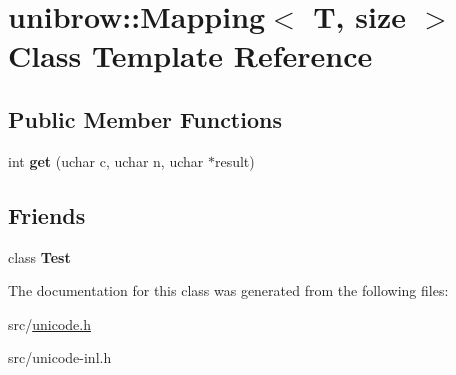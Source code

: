 \hypertarget{classunibrow_1_1_mapping}{}\section{unibrow\+:\+:Mapping$<$ T, size $>$ Class Template Reference}
\label{classunibrow_1_1_mapping}
\subsection*{Public Member Functions}
\begin{DoxyCompactItemize}
\item 
\hypertarget{classunibrow_1_1_mapping_af188d9e55a5717b581e026969b33cd38}{}int {\bfseries get} (uchar c, uchar n, uchar $\ast$result)\label{classunibrow_1_1_mapping_af188d9e55a5717b581e026969b33cd38}

\end{DoxyCompactItemize}
\subsection*{Friends}
\begin{DoxyCompactItemize}
\item 
\hypertarget{classunibrow_1_1_mapping_a5b78b1c2e1fa07ffed92da365593eaa4}{}class {\bfseries Test}\label{classunibrow_1_1_mapping_a5b78b1c2e1fa07ffed92da365593eaa4}

\end{DoxyCompactItemize}


The documentation for this class was generated from the following files\+:\begin{DoxyCompactItemize}
\item 
src/\hyperlink{unicode_8h}{unicode.\+h}\item 
src/unicode-\/inl.\+h\end{DoxyCompactItemize}
